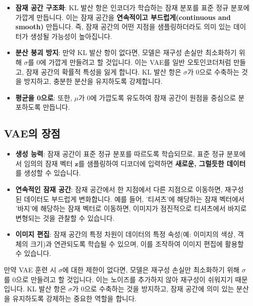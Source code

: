\documentclass[11pt,a4paper]{article}
\theoremstyle{definition}
\begin{document}
\begin{infobox}
\begin{itemize}
    \item \textbf{잠재 공간 구조화}: KL 발산 항은 인코더가 학습하는 잠재 분포를 표준 정규 분포에 가깝게 만듭니다. 이는 잠재 공간을 \textbf{연속적이고 부드럽게(continuous and smooth)} 만듭니다. 즉, 잠재 공간의 어떤 지점을 샘플링하더라도 의미 있는 데이터가 생성될 가능성이 높아집니다.
    \item \textbf{분산 붕괴 방지}: 만약 KL 발산 항이 없다면, 모델은 재구성 손실만 최소화하기 위해 $\sigma$를 0에 가깝게 만들려고 할 것입니다. 이는 VAE를 일반 오토인코더처럼 만들고, 잠재 공간의 확률적 특성을 잃게 합니다. KL 발산 항은 $\sigma$가 0으로 수축하는 것을 방지하고, 충분한 분산을 유지하도록 강제합니다.
    \item \textbf{평균을 0으로}: 또한, $\mu$가 0에 가깝도록 유도하여 잠재 공간이 원점을 중심으로 분포하도록 만듭니다.
\end{itemize}
\end{infobox}

\subsection{VAE의 장점}
\begin{itemize}
    \item \textbf{생성 능력}: 잠재 공간이 표준 정규 분포를 따르도록 학습되므로, 표준 정규 분포에서 임의의 잠재 벡터 $\mathbf{z}$를 샘플링하여 디코더에 입력하면 \textbf{새로운, 그럴듯한 데이터}를 생성할 수 있습니다.
    \item \textbf{연속적인 잠재 공간}: 잠재 공간에서 한 지점에서 다른 지점으로 이동하면, 재구성된 데이터도 부드럽게 변화합니다. 예를 들어, '티셔츠'에 해당하는 잠재 벡터에서 '바지'에 해당하는 잠재 벡터로 이동하면, 이미지가 점진적으로 티셔츠에서 바지로 변형되는 것을 관찰할 수 있습니다.
    \item \textbf{이미지 편집}: 잠재 공간의 특정 차원이 데이터의 특정 속성(예: 이미지의 색상, 객체의 크기)과 연관되도록 학습될 수 있으며, 이를 조작하여 이미지 편집에 활용할 수 있습니다.
\end{itemize}

\begin{warningbox}
만약 VAE 훈련 시 $\sigma$에 대한 제한이 없다면, 모델은 재구성 손실만 최소화하기 위해 $\sigma$를 0으로 만들려고 할 것입니다. 이는 노이즈를 추가하지 않아 재구성이 쉬워지기 때문입니다. KL 발산 항은 $\sigma$가 0으로 수축하는 것을 방지하고, 잠재 공간에 의미 있는 분산을 유지하도록 강제하는 중요한 역할을 합니다.
\end{warningbox}
\end{document}

